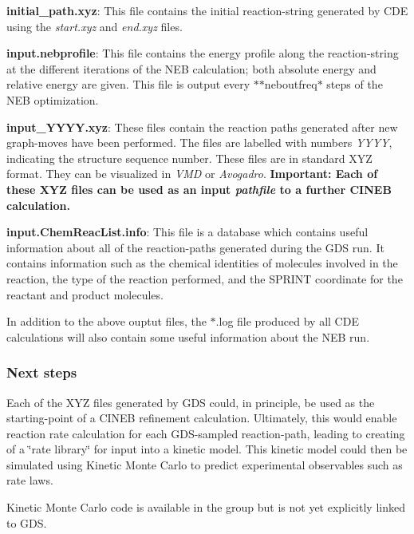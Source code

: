 \begin{DoxyItemize}
\item {\bfseries initial\+\_\+path.\+xyz}\+: This file contains the initial reaction-\/string generated by C\+DE using the {\itshape start.\+xyz} and {\itshape end.\+xyz} files.
\item {\bfseries input.\+nebprofile}\+: This file contains the energy profile along the reaction-\/string at the different iterations of the N\+EB calculation; both absolute energy and relative energy are given. This file is output every $\ast$$\ast$neboutfreq$\ast$ steps of the N\+EB optimization.
\item {\bfseries input\+\_\+\+Y\+Y\+Y\+Y.\+xyz}\+: These files contain the reaction paths generated after new graph-\/moves have been performed. The files are labelled with numbers {\itshape Y\+Y\+YY}, indicating the structure sequence number. These files are in standard X\+YZ format. They can be visualized in {\itshape V\+MD} or {\itshape Avogadro}. {\bfseries Important\+: Each of these X\+YZ files can be used as an input {\itshape pathfile} to a further C\+I\+N\+EB calculation.}
\item {\bfseries input.\+Chem\+Reac\+List.\+info}\+: This file is a database which contains useful information about all of the reaction-\/paths generated during the G\+DS run. It contains information such as the chemical identities of molecules involved in the reaction, the type of the reaction performed, and the S\+P\+R\+I\+NT coordinate for the reactant and product molecules.
\end{DoxyItemize}

In addition to the above ouptut files, the $\ast$.log file produced by all C\+DE calculations will also contain some useful information about the N\+EB run.

\subsubsection*{Next steps}


\begin{DoxyItemize}
\item Each of the X\+YZ files generated by G\+DS could, in principle, be used as the starting-\/point of a C\+I\+N\+EB refinement calculation. Ultimately, this would enable reaction rate calculation for each G\+D\+S-\/sampled reaction-\/path, leading to creating of a \char`\"{}rate library\char`\"{} for input into a kinetic model. This kinetic model could then be simulated using Kinetic Monte Carlo to predict experimental observables such as rate laws.
\item Kinetic Monte Carlo code is available in the group but is not yet explicitly linked to G\+DS. 
\end{DoxyItemize}